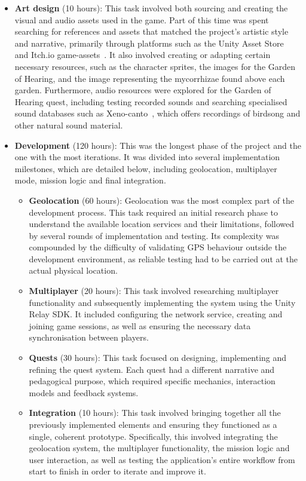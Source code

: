 \begin{itemize}
    \item \textbf{Art design} (10 hours): This task involved both sourcing and creating the visual and audio assets used in the game. Part of this time was spent searching for references and assets that matched the project’s artistic style and narrative, primarily through platforms such as the Unity Asset Store~\cite{unity_asset} and Itch.io game-assets~\cite{itch_io}. It also involved creating or adapting certain necessary resources, such as the character sprites, the images for the Garden of Hearing, and the image representing the mycorrhizae found above each garden. Furthermore, audio resources were explored for the Garden of Hearing quest, including testing recorded sounds and searching specialised sound databases such as Xeno-canto~\cite{xenocanto}, which offers recordings of birdsong and other natural sound material.
    
    \item \textbf{Development} (120 hours): This was the longest phase of the project and the one with the most iterations. It was divided into several implementation milestones, which are detailed below, including geolocation, multiplayer mode, mission logic and final integration.
    \begin{itemize}
        \item \textbf{Geolocation} (60 hours): Geolocation was the most complex part of the development process. This task required an initial research phase to understand the available location services and their limitations, followed by several rounds of implementation and testing. Its complexity was compounded by the difficulty of validating GPS behaviour outside the development environment, as reliable testing had to be carried out at the actual physical location.
        \item \textbf{Multiplayer} (20 hours): This task involved researching multiplayer functionality and subsequently implementing the system using the Unity Relay SDK. It included configuring the network service, creating and joining game sessions, as well as ensuring the necessary data synchronisation between players.
        \item \textbf{Quests} (30 hours): This task focused on designing, implementing and refining the quest system. Each quest had a different narrative and pedagogical purpose, which required specific mechanics, interaction models and feedback systems.
        \item \textbf{Integration} (10 hours): This task involved bringing together all the previously implemented elements and ensuring they functioned as a single, coherent prototype. Specifically, this involved integrating the geolocation system, the multiplayer functionality, the mission logic and user interaction, as well as testing the application’s entire workflow from start to finish in order to iterate and improve it.
    \end{itemize}


\end{itemize}
